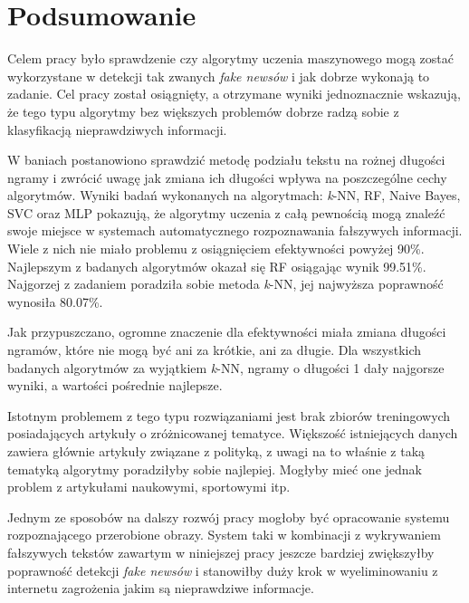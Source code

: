 \chapter{Podsumowanie}
Celem pracy było sprawdzenie czy algorytmy uczenia maszynowego mogą zostać wykorzystane
w detekcji tak zwanych \textit{fake newsów} i jak dobrze wykonają to zadanie. Cel pracy został osiągnięty,
a otrzymane wyniki jednoznacznie wskazują, że tego typu algorytmy bez większych problemów dobrze 
radzą sobie z klasyfikacją nieprawdziwych informacji.


W baniach postanowiono sprawdzić metodę podziału tekstu na rożnej długości ngramy i zwrócić uwagę 
jak zmiana ich długości wpływa na poszczególne cechy algorytmów.
Wyniki badań wykonanych na algorytmach: \textit{k}-NN, RF, Naive Bayes,
SVC oraz MLP pokazują, że algorytmy uczenia z całą pewnością mogą znaleźć swoje miejsce w systemach
automatycznego rozpoznawania fałszywych informacji. Wiele z nich nie miało problemu z osiągnięciem 
efektywności powyżej 90\%. Najlepszym z badanych algorytmów okazał się RF osiągając
wynik 99.51\%. Najgorzej z zadaniem poradziła sobie metoda \textit{k}-NN, jej najwyższa 
poprawność wynosiła 80.07\%.

Jak przypuszczano, ogromne znaczenie dla efektywności
miała zmiana długości ngramów, które nie mogą być ani za krótkie, ani za długie.
Dla wszystkich badanych algorytmów za wyjątkiem \textit{k}-NN, ngramy o długości 1 dały najgorsze wyniki, a wartości
pośrednie najlepsze.

Istotnym problemem z tego typu rozwiązaniami jest brak zbiorów treningowych posiadających 
artykuły o zróżnicowanej tematyce. Większość istniejących danych zawiera głównie artykuły związane z 
polityką, z uwagi na to właśnie z taką tematyką algorytmy poradziłyby sobie najlepiej. Mogłyby mieć one jednak problem 
z artykułami naukowymi, sportowymi itp.

Jednym ze sposobów na dalszy rozwój pracy mogłoby być opracowanie systemu rozpoznającego 
przerobione obrazy. System taki w kombinacji z wykrywaniem fałszywych tekstów zawartym
w niniejszej pracy jeszcze bardziej zwiększyłby poprawność detekcji \textit{fake newsów} i stanowiłby 
duży krok w wyeliminowaniu z internetu zagrożenia jakim są nieprawdziwe informacje.